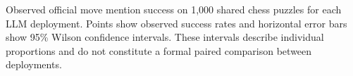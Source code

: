 \caption{Observed official move mention success on 1,000 shared chess puzzles for each LLM deployment. Points show observed success rates and horizontal error bars show 95\% Wilson confidence intervals. These intervals describe individual proportions and do not constitute a formal paired comparison between deployments.}
\label{fig:overall-success}
